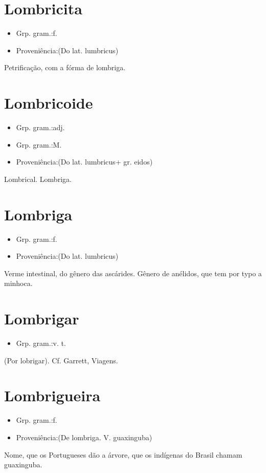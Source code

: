 \section{Lombricita}
\begin{itemize}
\item {Grp. gram.:f.}
\end{itemize}
\begin{itemize}
\item {Proveniência:(Do lat. \textunderscore lumbricus\textunderscore )}
\end{itemize}
Petrificação, com a fórma de lombriga.
\section{Lombricoide}
\begin{itemize}
\item {Grp. gram.:adj.}
\end{itemize}
\begin{itemize}
\item {Grp. gram.:M.}
\end{itemize}
\begin{itemize}
\item {Proveniência:(Do lat. \textunderscore lumbricus\textunderscore  + gr. \textunderscore eidos\textunderscore )}
\end{itemize}
Lombrical.
Lombriga.
\section{Lombriga}
\begin{itemize}
\item {Grp. gram.:f.}
\end{itemize}
\begin{itemize}
\item {Proveniência:(Do lat. \textunderscore lumbricus\textunderscore )}
\end{itemize}
Verme intestinal, do gênero das ascárides.
Gênero de anélidos, que tem por typo a minhoca.
\section{Lombrigar}
\begin{itemize}
\item {Grp. gram.:v. t.}
\end{itemize}
(Por \textunderscore lobrigar\textunderscore ). Cf. Garrett, \textunderscore Viagens\textunderscore .
\section{Lombrigueira}
\begin{itemize}
\item {Grp. gram.:f.}
\end{itemize}
\begin{itemize}
\item {Proveniência:(De \textunderscore lombriga\textunderscore . V. \textunderscore guaxinguba\textunderscore )}
\end{itemize}
Nome, que os Portugueses dão a árvore, que os indígenas do Brasil chamam guaxinguba.
